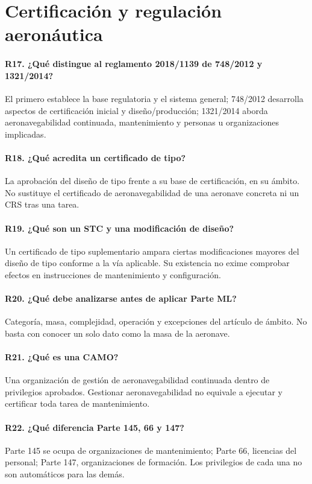 \section{Certificación y regulación aeronáutica}

\paragraph{R17. ¿Qué distingue al reglamento 2018/1139 de 748/2012 y 1321/2014?} El primero establece la base regulatoria y el sistema general; 748/2012 desarrolla aspectos de certificación inicial y diseño/producción; 1321/2014 aborda aeronavegabilidad continuada, mantenimiento y personas u organizaciones implicadas.

\paragraph{R18. ¿Qué acredita un certificado de tipo?} La aprobación del diseño de tipo frente a su base de certificación, en su ámbito. No sustituye el certificado de aeronavegabilidad de una aeronave concreta ni un CRS tras una tarea.

\paragraph{R19. ¿Qué son un STC y una modificación de diseño?} Un certificado de tipo suplementario ampara ciertas modificaciones mayores del diseño de tipo conforme a la vía aplicable. Su existencia no exime comprobar efectos en instrucciones de mantenimiento y configuración.

\paragraph{R20. ¿Qué debe analizarse antes de aplicar Parte ML?} Categoría, masa, complejidad, operación y excepciones del artículo de ámbito. No basta con conocer un solo dato como la masa de la aeronave.

\paragraph{R21. ¿Qué es una CAMO?} Una organización de gestión de aeronavegabilidad continuada dentro de privilegios aprobados. Gestionar aeronavegabilidad no equivale a ejecutar y certificar toda tarea de mantenimiento.

\paragraph{R22. ¿Qué diferencia Parte 145, 66 y 147?} Parte 145 se ocupa de organizaciones de mantenimiento; Parte 66, licencias del personal; Parte 147, organizaciones de formación. Los privilegios de cada una no son automáticos para las demás.

